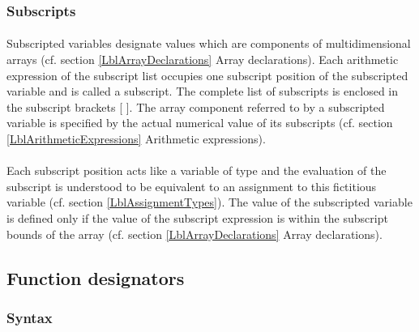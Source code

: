 \documentclass[a4paper,11pt]{article}
\begin{document}
\subsubsection{Subscripts}
\label{LblVariableSubscripts}

\paragraph{} \label{LblVariableSubscriptsP1}
Subscripted variables designate values which are components of
multidimensional arrays (cf. section \ref{LblArrayDeclarations} Array
declarations).  Each arithmetic expression of the subscript list
occupies one subscript position of the subscripted variable and is
called a subscript.  The complete list of subscripts is enclosed in
the subscript brackets [ ].  The array component referred to by a
subscripted variable is specified by the actual numerical value of its
subscripts (cf. section \ref{LblArithmeticExpressions} Arithmetic
expressions).

\paragraph{} \label{LblVariableSubscriptsP2}
Each subscript position acts like a variable of type 
and the evaluation of the subscript is understood to be equivalent to
an assignment to this fictitious variable (cf. section
\ref{LblAssignmentTypes}).  The value of the subscripted variable is
defined only if the value of the subscript expression is within the
subscript bounds of the array (cf. section \ref{LblArrayDeclarations}
Array declarations).



\subsection{Function designators}
\label{LblFunctionDesignators}


\subsubsection{Syntax}
\label{LblFunctionDesignatorsSyntax}
\end{document}
